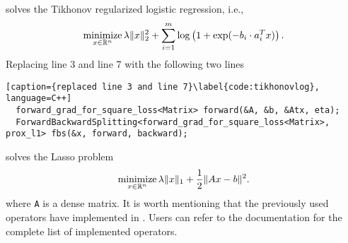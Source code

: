 solves the Tikhonov regularized logistic regression, i.e.,
$$\operatorname*{minimize}_{x \in \mathbb{R}^n} \lambda \|x\|_2^2 + \sum_{i = 1}^m \log\left(1 + \exp(-b_i \cdot a_i^T x)\right).$$
Replacing line 3 and line 7 with
the following two lines
\begin{lstlisting}[caption={replaced line 3 and line 7}\label{code:tikhonovlog}, language=C++]
  forward_grad_for_square_loss<Matrix> forward(&A, &b, &Atx, eta);
  ForwardBackwardSplitting<forward_grad_for_square_loss<Matrix>, prox_l1> fbs(&x, forward, backward);
\end{lstlisting}
solves the Lasso problem
$$\operatorname*{minimize}_{x \in \mathbb{R}^n} \lambda \|x\|_1 + \frac{1}{2}\|A x - b\|^2.$$
where \texttt{A} is a dense matrix. It is worth mentioning that the previously used operators have implemented in \pkg. Users can refer to the documentation for
the complete list of implemented operators.


